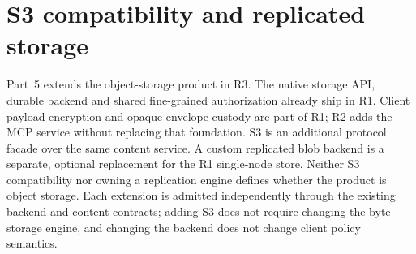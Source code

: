 \section{S3 compatibility and replicated storage}\label{sec:storage}
Part~5 extends the object-storage product in R3. The native storage API, durable backend and shared fine-grained authorization already ship in R1. Client payload encryption and opaque envelope custody are part of R1; R2 adds the MCP service without replacing that foundation. S3 is an additional protocol facade over the same content service. A custom replicated blob backend is a separate, optional replacement for the R1 single-node store. Neither S3 compatibility nor owning a replication engine defines whether the product is object storage. Each extension is admitted independently through the existing backend and content contracts; adding S3 does not require changing the byte-storage engine, and changing the backend does not change client policy semantics.

